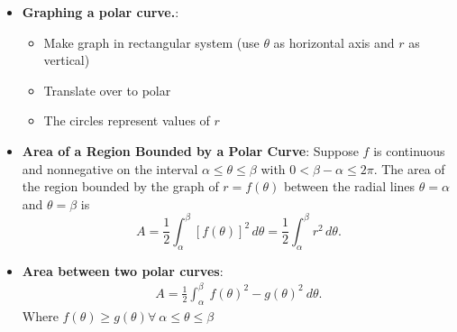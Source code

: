 \documentclass{report}
\begin{document}
\begin{itemize}
     \pagebreak 
    \item \textbf{Graphing a polar curve.}:
        \begin{itemize}
            \item Make graph in rectangular system (use $\theta$ as horizontal axis and $r$ as vertical)
            \item Translate over to polar
            \item The circles represent values of $r$
        \end{itemize}
        \item \textbf{Area of a Region Bounded by a Polar Curve}:
             Suppose \( f \) is continuous and nonnegative on the interval \( \alpha \leq \theta \leq \beta \) with \( 0 < \beta - \alpha \leq 2\pi \). The area of the region bounded by the graph of \( r = f(\theta) \) between the radial lines \( \theta = \alpha \) and \( \theta = \beta \) is
                \[ A = \frac{1}{2} \int_{\alpha}^{\beta} [f(\theta)]^2 \, d\theta = \frac{1}{2} \int_{\alpha}^{\beta} r^2 \, d\theta. \]
        \item \textbf{Area between two polar curves}:
            \begin{align*}
                A = \frac{1}{2}\int_{\alpha}^{\beta}\ f(\theta)^{2} -g(\theta )^{2}\ d\theta 
            .\end{align*}
            Where $f(\theta ) \geq g(\theta ) \forall\ \alpha \leq \theta \leq \beta $


\end{itemize}
\end{document}
